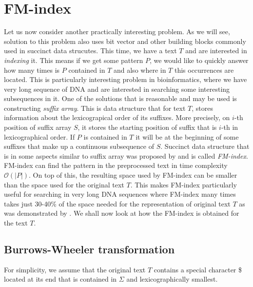 \section{FM-index}

Let us now consider another practically interesting problem. As we will see, solution
to this problem also uses bit vector and other building blocks commonly used in succinct
data strucutes. This time, we have a text $T$ and are interested in \textit{indexing} it.
This means if we get some pattern $P$, we would like to quickly answer how many times is
$P$ contained in $T$ and also where in $T$ this occurrences are located. This is particularly
interesting problem in bioinformatics, where we have very long sequence of DNA and are
interested in searching some interesting subsequences in it. One of the solutions that is
reasonable and may be used is constructing \textit{suffix array}. This is data structure
that for text $T$, stores information about the lexicograpical order of its suffixes. More
precisely, on $i$-th position of suffix array $S$, it stores the starting position of suffix
that is $i$-th in lexicographical order. If $P$ is contained in $T$ it will be at the
beginning of some suffixes that make up a continuous subsequence of $S$. Succinct data
structure that is in some aspects similar to suffix array was proposed by
\cite{ferragina2000opportunistic} and is called \textit{FM-index}. FM-index can find the
pattern in the preprocessed text in time complexity $\mathcal{O}(|P|)$. On top of this, the
resulting space used by FM-index can be smaller than the space used for the original text
$T$. This makes FM-index particularly useful for searching in very long DNA sequences where
FM-index many times takes just 30-40\% of the space needed for the representation of original
text $T$ as was demonstrated by \cite{ferragina2001experimental}. We shall now look at how the
FM-index is obtained for the text $T$.

\subsection{Burrows-Wheeler transformation}

For simplicity, we assume that the original text $T$ contains a special character \$
located at its end that is contained in $\Sigma$ and lexicographically smallest.

